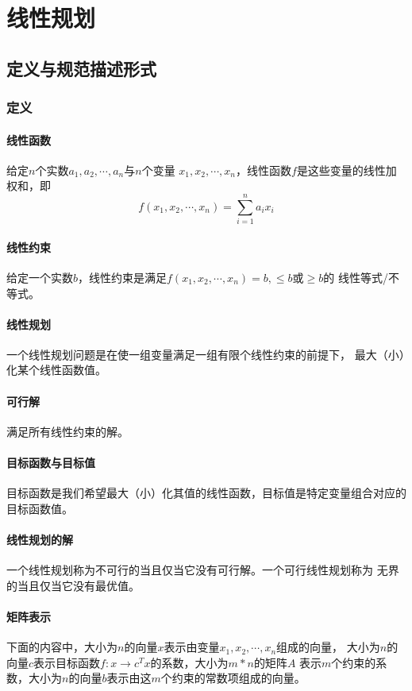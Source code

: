 \section{线性规划}\label{LP}
\subsection{定义与规范描述形式}
\subsubsection{定义}
\paragraph{线性函数} 给定$n$个实数$a_1,a_2,\cdots,a_n$与$n$个变量
$x_1,x_2,\cdots,x_n$，线性函数$f$是这些变量的线性加权和，即
\begin{displaymath}
    f(x_1,x_2,\cdots,x_n)=\sum_{i=1}^n{a_ix_i}
\end{displaymath}
\paragraph{线性约束}
给定一个实数$b$，线性约束是满足$f(x_1,x_2,\cdots,x_n)=b,\leq b$或$\geq b$的
线性等式/不等式。
\paragraph{线性规划}
一个线性规划问题是在使一组变量满足一组有限个线性约束的前提下，
最大（小）化某个线性函数值。
\paragraph{可行解}
满足所有线性约束的解。
\paragraph{目标函数与目标值}
目标函数是我们希望最大（小）化其值的线性函数，目标值是特定变量组合对应的目标函数值。
\paragraph{线性规划的解}
一个线性规划称为不可行的当且仅当它没有可行解。一个可行线性规划称为
无界的当且仅当它没有最优值。
\paragraph{矩阵表示}
下面的内容中，大小为$n$的向量$x$表示由变量$x_1,x_2,\cdots,x_n$组成的向量，
大小为$n$的向量$c$表示目标函数$f:x\rightarrow c^Tx$的系数，大小为$m*n$的矩阵$A$
表示$m$个约束的系数，大小为$n$的向量$b$表示由这$m$个约束的常数项组成的向量。

